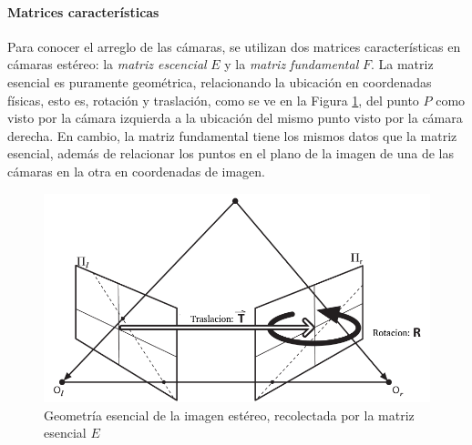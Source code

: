 \paragraph{Matrices características}
Para conocer el arreglo de las cámaras, se utilizan dos matrices características en cámaras estéreo: la \textit{matriz escencial} $E$ y la \textit{matriz fundamental} $F$. La matriz esencial es puramente geométrica, relacionando la ubicación en coordenadas físicas, esto es, rotación y traslación, como se ve en la Figura \ref{fig:essentialgeometry}, del punto $P$ como visto por la cámara izquierda a la ubicación del mismo punto visto por la cámara derecha. En cambio, la matriz fundamental tiene los mismos datos que la matriz esencial, además de relacionar los puntos en el plano de la imagen de una de las cámaras en la otra en coordenadas de imagen.
\begin{figure}
    \centering
    \includegraphics[width=\linewidth]{Img/EssentialGeometry.png}
    \caption{Geometría esencial de la imagen estéreo, recolectada por la matriz esencial $E$}
    \label{fig:essentialgeometry}
\end{figure}

